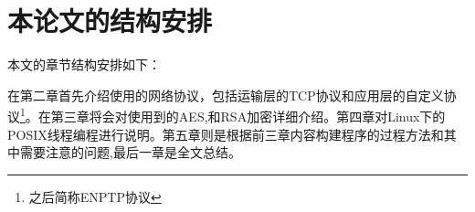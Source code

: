 \section{本论文的结构安排}
本文的章节结构安排如下：

在第二章首先介绍使用的网络协议，包括运输层的TCP协议和应用层的自定义协议\footnote{之后简称ENPTP协议}。在第三章将会对使用到的AES,和RSA加密详细介绍。第四章对Linux下的POSIX线程编程进行说明。第五章则是根据前三章内容构建程序的过程方法和其中需要注意的问题,最后一章是全文总结。

